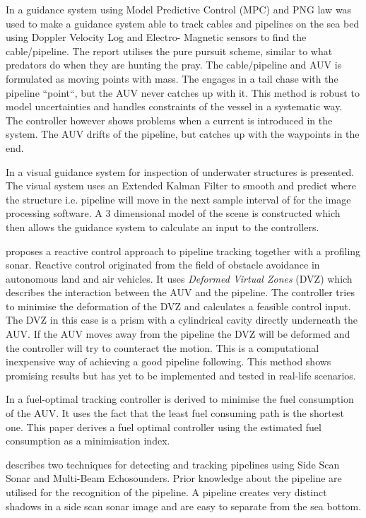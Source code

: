 	In \cite{MPC_pure_pursuit} a guidance system using Model Predictive Control (MPC) and PNG law was used to make 
	a guidance system able to track cables and pipelines on the sea bed using Doppler Velocity Log and Electro-
	Magnetic sensors to find the cable/pipeline. The report utilises the pure pursuit scheme, similar to
what 
	predators do when they are hunting the pray. The cable/pipeline and AUV is formulated as moving points
with 
	mass. The engages in a tail chase with the pipeline ``point``, but the AUV never catches up with it. This 
	method is robust to model uncertainties and handles constraints of the vessel in a systematic way. The
controller
	however shows problems when a current is introduced in the system. The AUV drifts of the pipeline, but catches 
	up with the waypoints in the end.
	
	In \cite{Visual_inpsection_of_seabottom_by_AUV} a visual guidance system for inspection of underwater
structures 
	is presented. The visual system uses an Extended Kalman Filter to smooth and predict where the structure i.e. 
	pipeline will move in the next sample interval of for the image processing software. A 3 dimensional
model 
	of the scene is constructed which then allows the guidance system to calculate an input to the
controllers.
	
	\cite{reactive_control_AUV} proposes a reactive control approach to pipeline tracking together with a 
	profiling sonar. Reactive control originated from the field of obstacle avoidance in autonomous land and air 
	vehicles. It uses \textit{Deformed Virtual Zones} (DVZ) which describes the interaction between the AUV and 
	the pipeline. The controller tries to minimise the deformation of the DVZ and calculates a feasible
control input. 
	The DVZ in this case is a prism with a cylindrical cavity directly underneath the AUV. If the AUV
moves away from 
	the pipeline the DVZ will be deformed and the controller will try to counteract the motion. This is a 
	computational inexpensive way of achieving a good pipeline following. This method shows promising results 
	but has yet to be implemented and tested in real-life scenarios. 
	
	In \cite{fuel_optimal_control} a fuel-optimal tracking controller is derived to minimise the fuel
consumption 
	of the AUV. It uses the fact that the least fuel consuming path is the shortest one. This
	paper derives a fuel optimal controller using the estimated fuel consumption as a minimisation index. 

	\cite{side_scan_sonar} describes two techniques for detecting and tracking pipelines using Side Scan
	Sonar and Multi-Beam Echosounders. Prior knowledge about the pipeline are utilised for the recognition
	of the pipeline. A pipeline creates very distinct shadows in a side scan sonar image and are easy to
	separate from the sea bottom.


